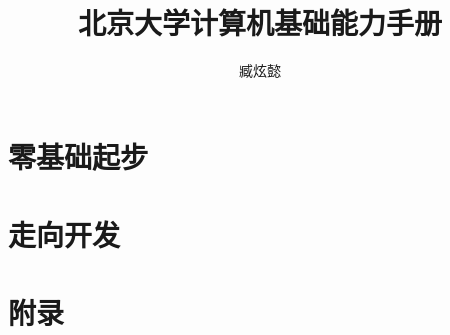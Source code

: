 \documentclass[openany]{ctexbook}
\title{\Huge\textbf{北京大学计算机基础能力手册}}
\author[1]{臧炫懿}
\affil[1]{北京大学学生Linux俱乐部}
\affil[ ]{\faGithub\ \texttt{ZangXuanyi/getting-started-handout}}
\affil[ ]{\faEnvelope\ \texttt{zangxuanyi@stu.pku.edu.cn}}
\date{}
\begin{document}
\maketitle

\frontmatter



\mainmatter

  \tableofcontents

\part{零基础起步}





% 








% 





\part{走向开发}













% 

\backmatter

\part{附录}




\end{document}
